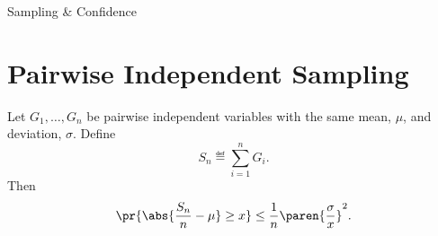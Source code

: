 \documentclass[handout]{mcs}
\begin{document}


\begin{staffnotes}
Sampling \& Confidence
\end{staffnotes}




\section*{Pairwise Independent Sampling}

\begin{theorem*}
Let $G_1, \dots, G_n$ be pairwise independent variables with the same
mean, $\mu$, and deviation, $\sigma$.  Define
\[
S_n \eqdef \sum_{i=1}^n G_i.
\]
Then
\[
\pr{\abs{\frac{S_n}{n} - \mu} \geq x}
    \leq \frac{1}{n} \paren{\frac{\sigma}{x}}^2.
\]
\end{theorem*}
\end{document}
